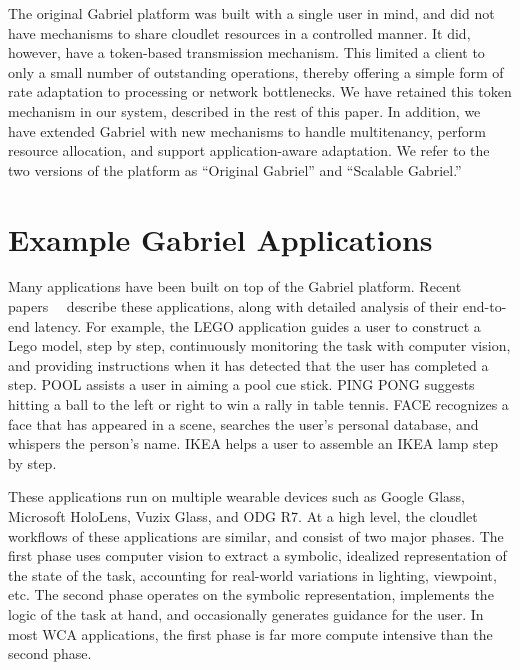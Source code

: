 The original Gabriel platform was built with a single user in mind,
and did not have mechanisms to share cloudlet resources in a
controlled manner.  It did, however, have a token-based transmission
mechanism.  This limited a client to only a small number of
outstanding operations, thereby offering a simple form of rate
adaptation to processing or network bottlenecks.  We have retained
this token mechanism in our system, described in the rest of this paper.
In addition, we have extended Gabriel with new mechanisms to handle
multitenancy, perform resource allocation, and support
application-aware adaptation.  We refer to the two versions of the
platform as ``Original Gabriel'' and ``Scalable Gabriel.''

\section{Example Gabriel Applications}

Many applications have been built on top of the Gabriel platform.  Recent
papers~\cite{Chen2017}~\cite{chen2018} describe these applications, along with detailed analysis
of their end-to-end latency. For example, the LEGO application guides a user to
construct a Lego model, step by step, continuously monitoring the task with
computer vision, and providing instructions when it has detected that the user
has completed a step. POOL assists a user in aiming a pool cue stick. PING PONG
suggests hitting a ball to the left or right to win a rally in table tennis.
FACE recognizes a face that has appeared in a scene, searches the user's
personal database, and whispers the person's name. IKEA helps a user to
assemble an IKEA lamp step by step.

These applications run on multiple wearable devices such as Google
Glass, Microsoft HoloLens, Vuzix Glass, and ODG R7. At a high level, 
the cloudlet workflows of these applications are similar, and consist of
two major phases.  The first phase uses computer vision
to extract a symbolic, idealized representation of the state of the
task, accounting for real-world variations in lighting, viewpoint,
etc.  The second phase operates on the symbolic representation,
implements the logic of the task at hand, and occasionally generates
guidance for the user.  In most WCA applications, the first phase is
far more compute intensive than the second phase.

